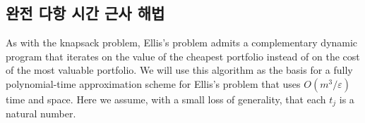 \documentclass[11pt]{article} %
\newcommand{\lIfElse}[3]{\lIf{#1}{#2 \textbf{else}~#3}}
\newif\ifen
\newtheorem{theorem}{Theorem}
\theoremstyle{definition}
\newtheorem{theorem}{정리}
\theoremstyle{definition}
\begin{document}
%
%


\ifen \subsection{Fully polynomial-time approximation scheme}\else \subsection{완전 다항 시간 근사 해법}\fi \label{fptashead}
As with the knapsack problem, Ellis's problem admits a complementary dynamic program that iterates on the value of the cheapest portfolio instead of on the cost of the most valuable portfolio. We will use this algorithm as the basis for a fully polynomial-time approximation scheme for Ellis's problem that uses $O(m^3 / \varepsilon)$ time and space. Here we assume, with a small loss of generality, that each $t_j$ is a natural number.
\end{document}

